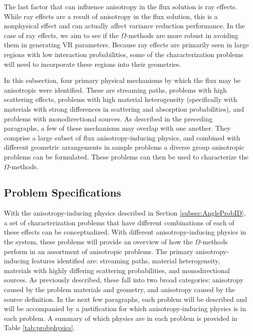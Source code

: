 The last factor that can influence anisotropy in the flux solution is ray
effects. While ray effects are a result of anisotropy in the flux solution, this
is a nonphysical effect and can actually affect variance reduction
performance. In the case of ray effects, we aim to see if the
$\Omega$-methods are more robust in avoiding them in generating VR parameters.
Because ray effects are primarily seen in large regions with low interaction
probabilities, some of the characterization problems will need to
incorporate these regions into their geometries.

In this subsection, four primary physical mechanisms by which the flux may
be anisotropic were identified. These are streaming paths, problems with high
scattering effects, problems with high material heterogeneity (specifically with
materials with strong differences in scattering and absorption probabilities),
and problems with monodirectional sources. As described in the preceding
paragraphs, a few of these mechanisms may overlap
with one another. They comprise a large subset of flux
anisotropy-inducing physics, and combined with different geometric arrangements
in sample problems a diverse group anisotropic problems can be formulated. These
problems can then be used to characterize the $\Omega$-methods.

\subsection{Problem Specifications}
\label{subsec:ProbSpecs}

With the anisotropy-inducing physics described in Section
\ref{subsec:AngleProbID}, a set of characterization problems that have
different combinations of each of these effects can be conceptualized. With
different anisotropy-inducing physics in the system, these problems will provide
an overview of how the $\Omega$-methods perform in an assortment of anisotropic
problems. The primary anisotropy-inducing features identified are: streaming
paths, material heterogeneity, materials with highly differing scattering
probabilities, and monodirectional sources. As previously described, these fall
into two broad categories: anisotropy caused by the problem materials and
geometry, and anisotropy caused by the source definition. In the next few
paragraphs, each problem will be described and will be accompanied by
a justification for which
anisotropy-inducing physics is in each problem. A summary of which physics are
in each problem is provided in Table \ref{tab:probphysics}.

